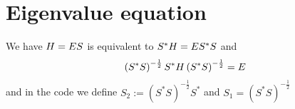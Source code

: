 \documentclass[11pt,a4paper,reqno,french,tikz]{amsart}
\newcommand{\pa}[1]{\left( #1 \right)} %
\let\p\relax\newcommand{\p}{\psi} %
\newcommand{\f}[2]{\frac{#1}{#2}} %
\begin{document}
\section{Eigenvalue equation}%
\label{sec:eigenvalue_equation}

We have $H \p = E S \p$ is equivalent to $S^*H \p = E S^*S \p$ and
\begin{align*}
\pa{S^* S}^{-\f 12} S^* H \pa{S^* S}^{-\f 12} \p = E \p
\end{align*}
and in the code we define $S_2 := \pa{S^* S}^{-\f 12} S^*$ and $S_1 = \pa{S^* S}^{-\f 12}$





\end{document}
